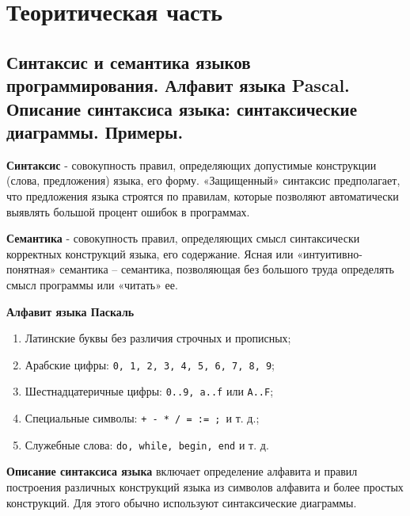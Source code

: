 \section{Теоритическая часть}


\subsection{Синтаксис  и  семантика  языков  программирования.  Алфавит  языка  Pascal.  Описание синтаксиса языка: синтаксические диаграммы. Примеры. }

\begin{myquote}

\end{myquote}
\large

{\bf{Синтаксис}}
 - совокупность правил, определяющих допустимые конструкции (слова, предложения) языка, его форму. «Защищенный» синтаксис предполагает, что предложения языка строятся по правилам, которые позволяют автоматически выявлять большой процент ошибок в программах.

{\bf{Семантика}}
 - совокупность правил, определяющих смысл синтаксически корректных конструкций языка, его содержание. Ясная или «интуитивно-понятная» семантика – семантика, позволяющая без большого труда определять смысл программы или «читать» ее.

\noindent
{\bf{Алфавит языка Паскаль  }}

\begin{enumerate}
\item Латинские буквы без различия строчных и прописных;
\item Арабские цифры: \texttt{0, 1, 2, 3, 4, 5, 6, 7, 8, 9};
\item Шестнадцатеричные цифры: \texttt{0..9, a..f} или \texttt{A..F};
\item Специальные символы: \texttt{+ - * / = := ; }и т. д.;
\item Служебные слова: \texttt{do, while, begin, end} и т. д.
\end{enumerate}

{\bf{Описание синтаксиса языка}}
включает определение алфавита и правил построения различных конструкций языка из символов алфавита и более простых конструкций. Для этого обычно используют синтаксические диаграммы.

